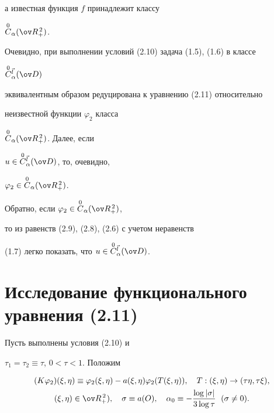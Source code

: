 а известная функция $f$ принадлежит классу


$\OC_\alpha(\ov R^{\,2}_+)$.





\begin{notes}


Очевидно, при выполнении условий (2.10) задача (1.5), (1.6) в классе


$\OC^{\Vec l}_\alpha(\ov D)$


эквивалентным образом редуцирована к уравнению (2.11) относительно


неизвестной функции $\varphi_2$ класса


$\OC_\alpha(\ov R^{\,2}_+)$. Далее, если


$u\in\OC^{\Vec l}_\alpha(\ov D)$, то, очевидно,


$\varphi_2\in\OC_\alpha(\ov R^{\,2}_+)$.


Обратно, если $\varphi_2\in\OC_\alpha(\ov R^{\,2}_+)$,


то из равенств (2.9), (2.8), (2.6) с учетом неравенств


(1.7) легко показать, что $u\in\OC^{\Vec l}_\alpha(\ov D)$.


\end{notes}





\section{Исследование функционального уравнения (2.11)}





Пусть выполнены условия (2.10) и


$\tau_1=\tau_2\equiv\tau$, $0<\tau<1$. Положим


\begin{gather*}


(K\varphi_2)(\xi,\eta)\equiv\varphi_2(\xi,\eta)-


a(\xi,\eta)\varphi_2(T(\xi,\eta)),\quad


T:(\xi,\eta)\to(\tau\eta,\tau\xi), \\


(\xi,\eta)\in\ov R^{\,2}_+),\quad \sigma\equiv a(O),\quad


\alpha_0\equiv-\frac{\log|\sigma|}{3\log\tau}\ \; (\sigma\ne 0).


\end{gather*}





